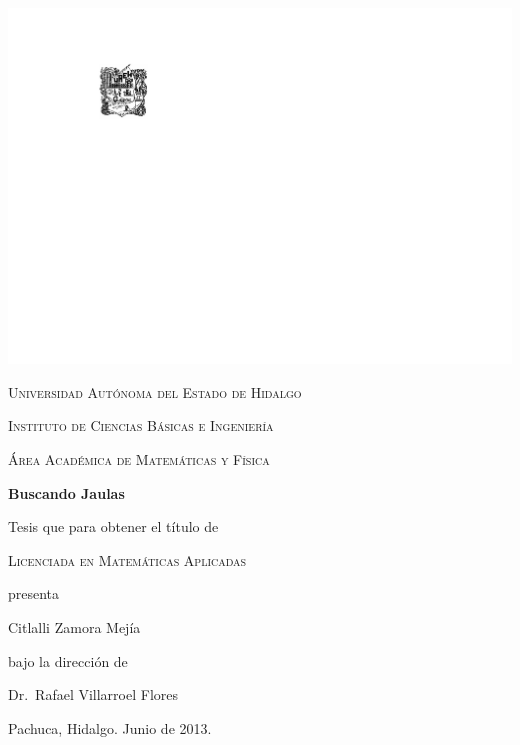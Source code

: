 \documentclass[12pt]{book}
\theoremstyle{definition}
\begin{document}


\begin{titlepage}
  \begin{center}
    \includegraphics[scale=1.2,bb=55 20 0 0]{escudouaeh.pdf}

    \vspace*{2cm}

    \textsc{Universidad Autónoma del Estado de Hidalgo}

    \textsc{Instituto de Ciencias Básicas e Ingeniería}

    \textsc{Área Académica de Matemáticas y Física}

    \vspace*{2cm}

    \textbf{\Huge Buscando Jaulas}

    \vspace*{2cm}

    {\large Tesis que para obtener el título de}

    \vspace*{2cm}

    \textsc{Licenciada en Matemáticas Aplicadas}

    {\large presenta}

    \vspace*{2cm}

    {\Huge Citlalli Zamora Mejía}

    \bigskip

    {\large bajo la dirección de}

    \bigskip

    {\Large Dr.~Rafael Villarroel Flores}

    \bigskip

    {Pachuca, Hidalgo. Junio de 2013.} \\

  \end{center}
\end{titlepage}
\end{document}
